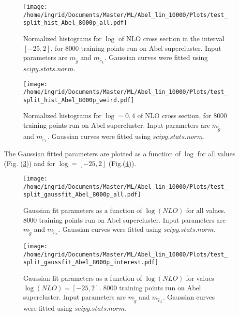 \documentclass[twoside,english]{uiofysmaster}
\begin{document}
\begin{figure}[H]
\centering
\texttt{[image: /home/ingrid/Documents/Master/ML/Abel\_lin\_10000/Plots/test\_split\_hist\_Abel\_8000p\_all.pdf]}
\caption{Normalized histograms for $\log$ of NLO cross section in the interval $[-25,2]$, for 8000 training points run on Abel supercluster. Input parameters are $m_{\tilde{g}}$ and $m_{\tilde{c}_L}$. Gaussian curves were fitted using $scipy.stats.norm$.}
\label{Fig:: Abel 8000p error hist split all}
\end{figure}

\begin{figure}
\centering
\texttt{[image: /home/ingrid/Documents/Master/ML/Abel\_lin\_10000/Plots/test\_split\_hist\_Abel\_8000p\_weird.pdf]}
\caption{Normalized histograms for $\log=0,4$ of NLO cross section, for 8000 training points run on Abel supercluster. Input parameters are $m_{\tilde{g}}$ and $m_{\tilde{c}_L}$. Gaussian curves were fitted using $scipy.stats.norm$.}
\label{Fig:: Abel 8000p error hist split weird}
\end{figure}

The Gaussian fitted parameters are plotted as a function of $\log$ for all values (Fig. (\ref{Fig:: Abel 8000p error hist gauss fit all})) and for $\log= [-25, 2]$ (Fig.(\ref{Fig:: Abel 8000p error hist gauss fit interesting})).

\begin{figure}[H]
\centering
\texttt{[image: /home/ingrid/Documents/Master/ML/Abel\_lin\_10000/Plots/test\_split\_gaussfit\_Abel\_8000p\_all.pdf]}
\caption{Gaussian fit parameters as a function of $\log (NLO)$ for all values. 8000 training points run on Abel supercluster. Input parameters are $m_{\tilde{g}}$ and $m_{\tilde{c}_L}$. Gaussian curves were fitted using $scipy.stats.norm$.}
\label{Fig:: Abel 8000p error hist gauss fit all}
\end{figure}

\begin{figure}[H]
\centering
\texttt{[image: /home/ingrid/Documents/Master/ML/Abel\_lin\_10000/Plots/test\_split\_gaussfit\_Abel\_8000p\_interest.pdf]}
\caption{Gaussian fit parameters as a function of $\log (NLO)$ for values $\log(NLO) = [-25, 2]$. 8000 training points run on Abel supercluster. Input parameters are $m_{\tilde{g}}$ and $m_{\tilde{c}_L}$. Gaussian curves were fitted using $scipy.stats.norm$.}
\label{Fig:: Abel 8000p error hist gauss fit interesting}
\end{figure}
\end{document}
